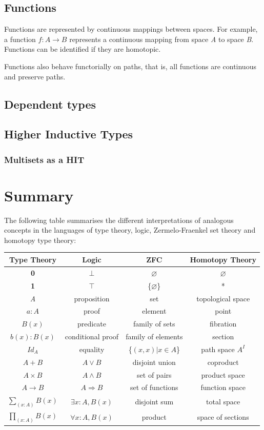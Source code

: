 \documentclass[12pt]{report}
\begin{document}
\subsection{Functions}
Functions are represented by continuous mappings between spaces. For example, a function $f : A \rightarrow B$ represents a continuous mapping from space \textit{A} to space \textit{B}. Functions can be identified if they are homotopic.

Functions also behave functorially on paths, that is, all functions are continuous and preserve paths.


\subsection{Dependent types}


\subsection{Higher Inductive Types}
\subsubsection{Multisets as a HIT}


\section{Summary}

The following table summarises the different interpretations of analogous concepts in the languages of type theory, logic, Zermelo-Fraenkel set theory and homotopy type theory:

\begin{center}
\begin{tabular}{| c | c | c | c |}
\hline
\textbf{Type Theory} & \textbf{Logic} & \textbf{ZFC} & \textbf{Homotopy Theory}\\
\hline
\textbf{0} & $\bot$ & $\varnothing$ &$\varnothing$\\
\textbf{1} & $\top$ & \{$\varnothing$\} &*\\
\textit{A} & proposition & set & topological space\\
$a : A$ & proof & element & point\\
$B(x)$ & predicate & family of sets & fibration\\
$b(x) : B(x)$ & conditional proof & family of elements & section\\
$ Id_A $ & equality & \{$ (x,x) | x \in A $\} & path space $A^{\textit{I}}$\\
$A + B$ & $A \vee B$ & disjoint union & coproduct\\
$ A \times B$ & $A \wedge B$ & set of pairs & product space\\
$A \rightarrow B$ & $A \Rightarrow B$ & set of functions & function space\\
$ \sum_{(x:A)}^{} B(x) $ & $\exists x:A, B(x) $ & disjoint sum & total space\\
$ \prod_{(x:A)}^{} B(x) $ & $\forall x:A, B(x) $ & product & space of sections\\
\hline
\end{tabular}
\end{center}
\end{document}
